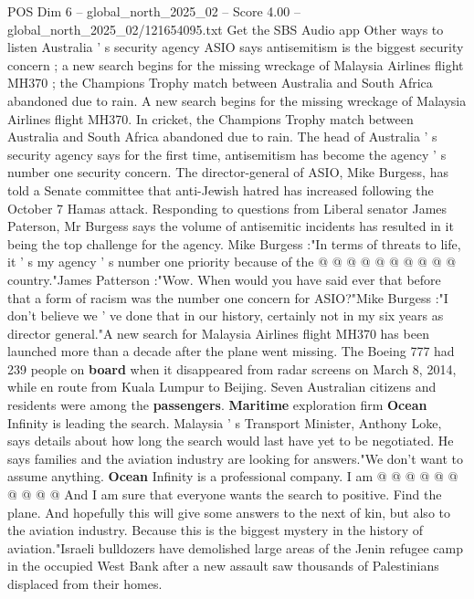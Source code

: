 \begin{textsample}{POS Dim 6 – global\_north\_2025\_02 – Score 4.00 – global\_north\_2025\_02/121654095.txt}  \label{ex:f6_pos_349}
Get the SBS Audio app Other ways to listen Australia ' s security agency ASIO says antisemitism is the biggest security concern ; a new search begins for the missing wreckage of Malaysia Airlines flight MH370 ; the Champions Trophy match between Australia and South Africa abandoned due to rain.
A new search begins for the missing wreckage of Malaysia Airlines flight MH370.
In cricket, the Champions Trophy match between Australia and South Africa abandoned due to rain.
The head of Australia ' s security agency says for the first time, antisemitism has become the agency ' s number one security concern.
The director-general of ASIO, Mike Burgess, has told a Senate committee that anti-Jewish hatred has increased following the October 7 Hamas attack.
Responding to questions from Liberal senator James Paterson, Mr Burgess says the volume of antisemitic incidents has resulted in it being the top challenge for the agency.
Mike Burgess :"In terms of threats to life, it ' s my agency ' s number one priority because of the @ @ @ @ @ @ @ @ @ @ country."James Patterson :"Wow.
When would you have said ever that before that a form of racism was the number one concern for ASIO?"Mike Burgess :"I don't believe we ' ve done that in our history, certainly not in my six years as director general."A new search for Malaysia Airlines flight MH370 has been launched more than a decade after the plane went missing.
The Boeing 777 had 239 people on \textbf{board} when it disappeared from radar screens on March 8, 2014, while en route from Kuala Lumpur to Beijing.
Seven Australian citizens and residents were among the \textbf{passengers}. \textbf{Maritime} exploration firm \textbf{Ocean} Infinity is leading the search.
Malaysia ' s Transport Minister, Anthony Loke, says details about how long the search would last have yet to be negotiated.
He says families and the aviation industry are looking for answers."We don't want to assume anything. \textbf{Ocean} Infinity is a professional company.
I am @ @ @ @ @ @ @ @ @ @ And I am sure that everyone wants the search to positive.
Find the plane.
And hopefully this will give some answers to the next of kin, but also to the aviation industry.
Because this is the biggest mystery in the history of aviation."Israeli bulldozers have demolished large areas of the Jenin refugee camp in the occupied West Bank after a new assault saw thousands of Palestinians displaced from their homes.

\end{textsample}
